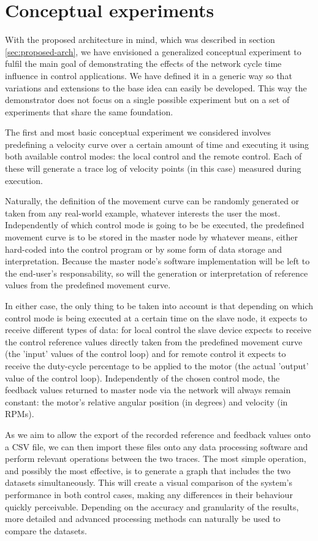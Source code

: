 \section{Conceptual experiments} \label{sec:experiments}

With the proposed architecture in mind, which was described in section \ref{sec:proposed-arch}, we have envisioned a generalized conceptual experiment to fulfil the main goal of demonstrating the effects of the network cycle time influence in control applications.
We have defined it in a generic way so that variations and extensions to the base idea can easily be developed.
This way the demonstrator does not focus on a single possible experiment but on a set of experiments that share the same foundation.

The first and most basic conceptual experiment we considered involves predefining a velocity curve over a certain amount of time and executing it using both available control modes: the local control and the remote control.
Each of these will generate a trace log of velocity points (in this case) measured during execution.

Naturally, the definition of the movement curve can be randomly generated or taken from any real-world example, whatever interests the user the most.
Independently of which control mode is going to be be executed, the predefined movement curve is to be stored in the master node by whatever means, either hard-coded into the control program or by some form of data storage and interpretation.
Because the master node's software implementation will be left to the end-user's responsability, so will the generation or interpretation of reference values from the predefined movement curve.

In either case, the only thing to be taken into account is that depending on which control mode is being executed at a certain time on the slave node, it expects to receive different types of data: for local control the slave device expects to receive the control reference values directly taken from the predefined movement curve (the 'input' values of the control loop) and for remote control it expects to receive the duty-cycle percentage to be applied to the motor (the actual 'output' value of the control loop).
Independently of the chosen control mode, the feedback values returned to master node via the network will always remain constant: the motor's relative angular position (in degrees) and velocity (in RPMs).

As we aim to allow the export of the recorded reference and feedback values onto a CSV file, we can then import these files onto any data processing software and perform relevant operations between the two traces.
The most simple operation, and possibly the most effective, is to generate a graph that includes the two datasets simultaneously.
This will create a visual comparison of the system's performance in both control cases, making any differences in their behaviour quickly perceivable.
Depending on the accuracy and granularity of the results, more detailed and advanced processing methods can naturally be used to compare the datasets.

